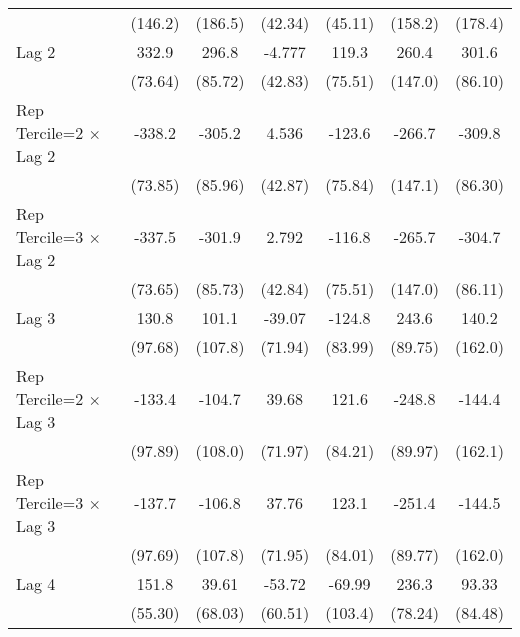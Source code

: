 \begin{table}[htbp]
\begin{tabular}{l*{6}{c}}
                &  (146.2)         &  (186.5)         &  (42.34)         &  (45.11)         &  (158.2)         &  (178.4)         \\
\addlinespace
Lag 2           &    332.9\sym{***}&    296.8\sym{***}&   -4.777         &    119.3         &    260.4         &    301.6\sym{***}\\
                &  (73.64)         &  (85.72)         &  (42.83)         &  (75.51)         &  (147.0)         &  (86.10)         \\
\addlinespace
Rep Tercile=2 $\times$ Lag 2&   -338.2\sym{***}&   -305.2\sym{***}&    4.536         &   -123.6         &   -266.7         &   -309.8\sym{***}\\
                &  (73.85)         &  (85.96)         &  (42.87)         &  (75.84)         &  (147.1)         &  (86.30)         \\
\addlinespace
Rep Tercile=3 $\times$ Lag 2&   -337.5\sym{***}&   -301.9\sym{***}&    2.792         &   -116.8         &   -265.7         &   -304.7\sym{***}\\
                &  (73.65)         &  (85.73)         &  (42.84)         &  (75.51)         &  (147.0)         &  (86.11)         \\
\addlinespace
Lag 3           &    130.8         &    101.1         &   -39.07         &   -124.8         &    243.6\sym{**} &    140.2         \\
                &  (97.68)         &  (107.8)         &  (71.94)         &  (83.99)         &  (89.75)         &  (162.0)         \\
\addlinespace
Rep Tercile=2 $\times$ Lag 3&   -133.4         &   -104.7         &    39.68         &    121.6         &   -248.8\sym{**} &   -144.4         \\
                &  (97.89)         &  (108.0)         &  (71.97)         &  (84.21)         &  (89.97)         &  (162.1)         \\
\addlinespace
Rep Tercile=3 $\times$ Lag 3&   -137.7         &   -106.8         &    37.76         &    123.1         &   -251.4\sym{**} &   -144.5         \\
                &  (97.69)         &  (107.8)         &  (71.95)         &  (84.01)         &  (89.77)         &  (162.0)         \\
\addlinespace
Lag 4           &    151.8\sym{**} &    39.61         &   -53.72         &   -69.99         &    236.3\sym{**} &    93.33         \\
                &  (55.30)         &  (68.03)         &  (60.51)         &  (103.4)         &  (78.24)         &  (84.48)         \\

\end{tabular}
\end{table}
